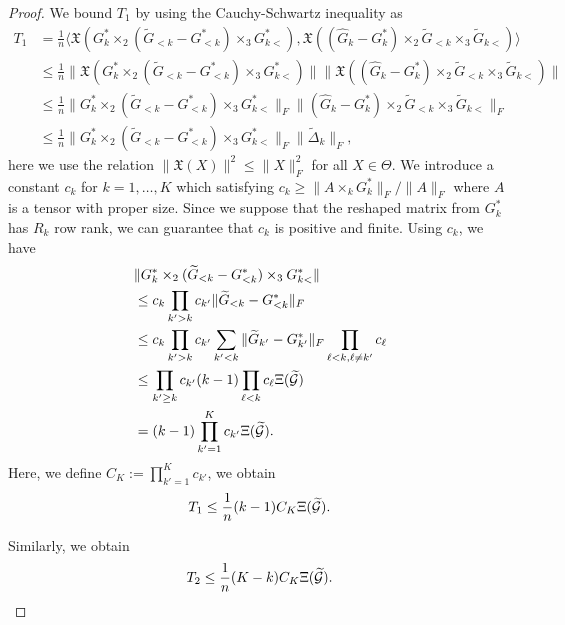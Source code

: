 \begin{proof}
We bound $T_1$ by using the Cauchy-Schwartz inequality as
\begin{align*}
T_1 &= \frac{1}{n} \langle  \mathfrak{X}(G_k^* \times_2 (\tilde{G}_{<k} - G_{<k}^*)\times_3 G_{k<}^*), \mathfrak{X}((\hat{G}_k - G_k^*) \times_2 \tilde{G}_{<k} \times_3 \tilde{G}_{k<}) \rangle \\
	& \leq \frac{1}{n} \|\mathfrak{X}(G_k^* \times_2 (\tilde{G}_{<k} - G_{<k}^*)\times_3 G_{k<}^*)\| \|\mathfrak{X}((\hat{G}_k - G_k^*) \times_2 \tilde{G}_{<k} \times_3 \tilde{G}_{k<})\| \\
	& \leq \frac{1}{n} \|G_k^* \times_2 (\tilde{G}_{<k} - G_{<k}^*)\times_3 G_{k<}^*\|_F \|(\hat{G}_k - G_k^*) \times_2 \tilde{G}_{<k} \times_3 \tilde{G}_{k<}\|_F\\
	& \leq \frac{1}{n} \|G_k^* \times_2 (\tilde{G}_{<k} - G_{<k}^*)\times_3 G_{k<}^*\|_F \|\tilde{\Delta}_k\|_F,	
\end{align*}
here we use the relation $\|\mathfrak{X}(X)\|^2 \leq \|X\|_F^2$ for all $X \in \Theta$.
We introduce a constant $c_k$ for $k = 1,\ldots,K$ which satisfying $c_k \geq \| A \times_k G_k^* \|_F / \|A\|_F$ where $A$ is a tensor with proper size.
Since we suppose that the reshaped matrix from $G_k^*$ has $R_k$ row rank, we can guarantee that $c_k$ is positive and finite.
Using $c_k$, we have
\begin{align*}
	&\|G_k^* \times_2 (\widetilde{G}_{<k} - G_{<k}^*)\times_3 G_{k<}^*\|\\
	&\leq c_k \prod_{k' > k}c_{k'} \|\widetilde{G}_{<k} - G_{<k}^*\|_F \\
	& \leq c_k \prod_{k' > k}c_{k'} \sum_{k' < k} \|\widetilde{G}_{k'} - G_{k'}^*\|_F \prod_{\ell < k, \ell \neq k'} c_{\ell} \\
	& \leq \prod_{k' \geq k}c_{k'} (k-1) \prod_{\ell < k}c_{\ell} \Xi(\widetilde{\mathcal{G}}) \\
	&= (k-1) \prod_{k'=1}^K c_{k'} \Xi(\widetilde{\mathcal{G}}).
\end{align*}
Here, we define $C_K :=  \prod_{k'=1}^K c_{k'}$, we obtain
\begin{align}
	T_1 \leq \frac{1}{n}(k-1)C_K\Xi(\widetilde{\mathcal{G}}). \label{ineq:t1}
\end{align}

Similarly, we obtain
\begin{align}
	T_2 \leq \frac{1}{n}(K-k)C_K\Xi(\widetilde{\mathcal{G}}). \label{ineq:t2}
\end{align}


\end{proof}
